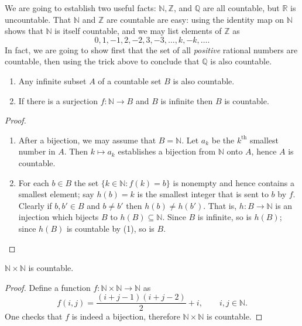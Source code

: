 We are going to establish two useful facts: $\mathbb{N}, \mathbb{Z}$, and $\mathbb{Q}$ are all countable, but $\mathbb{R}$ is uncountable.
That $\mathbb{N}$ and $\mathbb{Z}$ are countable are easy: using the identity map on $\mathbb{N}$ shows that $\mathbb{N}$ is itself countable, and we may list elements of $\mathbb{Z}$ as
\[
  0, 1, -1, 2, -2, 3, -3, \dots, k, -k, \dots.
\]
In fact, we are going to show first that the set of all {\em positive} rational numbers are countable, then using the trick above to conclude that $\mathbb{Q}$ is also countable.

\begin{prop}
  \label{prop:3-2}
  \begin{enumerate}[(1)]
    \item Any infinite subset $A$ of a countable set $B$ is also countable.
    \item If there is a surjection $f: \mathbb{N} \to B$ and $B$ is infinite then $B$ is countable.
  \end{enumerate}
\end{prop}

\begin{proof}
  \begin{enumerate}[(1)]
    \item After a bijection, we may assume that $B = \mathbb{N}$.
      Let $a_k$ be the $k^{\text{th}}$ smallest number in $A$.
      Then $k \mapsto a_k$ establishes a bijection from $\mathbb{N}$ onto $A$, hence $A$ is countable.

    \item For each $b \in B$ the set $\{k \in \mathbb{N} \colon f(k) = b \}$ is nonempty and hence contains a smallest element; say $h(b) = k$ is the smallest integer that is sent to $b$ by $f$.
      Clearly if $b, b' \in B$ and $b \ne b'$ then $h(b) \ne h(b')$.
      That is, $h: B \to \mathbb{N}$ is an injection which bijects $B$ to $h(B) \subseteq \mathbb{N}$.  Since $B$ is infinite, so is $h(B)$; since $h(B)$ is countable by (1), so is $B$.
  \end{enumerate}
\end{proof}

\begin{prop}
  $\mathbb{N} \times \mathbb{N}$ is countable.
\end{prop}

\begin{proof}
  Define a function $f: \mathbb{N} \times \mathbb{N} \to \mathbb{N}$ as 
  \[
    f(i,j) = \frac{(i+j-1)(i+j-2)}{2} + i, \qquad i, j \in \mathbb{N}.
  \]
  One checks that $f$ is indeed a bijection, therefore $\mathbb{N} \times \mathbb{N}$ is countable.
\end{proof}

